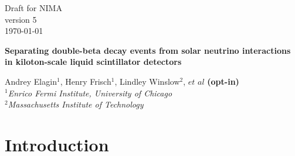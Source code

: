 \documentclass[12pt,twoside,letterpaper]{article}
\newcommand{\vbb}{0\nu\beta\beta}
\newcommand{\B}{^{8}B}
\begin{document}
\vspace*{-3.5cm}
\begin{flushright}
Draft for NIMA\\
version 5\\
\today
\end{flushright}



\begin{center}
  \begin{Large}
  {\bf Separating double-beta decay events from solar neutrino interactions in kiloton-scale liquid scintillator detectors}
  \end{Large}
\end{center}


\begin{center}
Andrey Elagin$^1$, Henry Frisch$^1$, Lindley Winslow$^2$, $et$ $al$ {\bf (opt-in)}\\
\emph{$^1$Enrico Fermi Institute, University of Chicago\\ 
$^2$Massachusetts Institute of Technology}
\end{center}



\begin{abstract}
We propose a technique for separating $\vbb$-decay events from background due to $\B$ solar neutrino interactions in a liquid scintillator detector. The technique compares event topology of the signal and background events using spherical harmonics analysis of the early light emitted in $\vbb$-decay and $\B$ events. Selection of early photons using fast photo-detectors allows for separation of directional Cherenkov from isotropic scintillation light and identification of two event topologies based on the spatial distribution of the early photons in the detector.
\end{abstract}

\newpage
\tableofcontents
\newpage





\section{Introduction}
\end{document}
